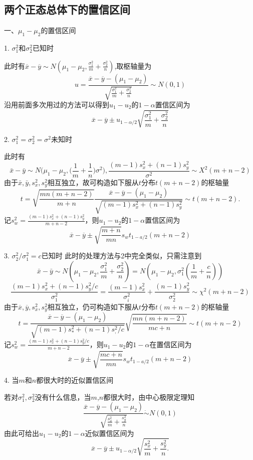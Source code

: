 \subsection{两个正态总体下的置信区间}

一、$\mu_1 -\mu_2$的置信区间

1. $\sigma_1^2$和$\sigma_2^2$已知时

此时有$\overline{x}-\overline{y} \sim N\left(\mu_1-\mu_2,\frac{\sigma_1^2}m+\frac{\sigma_2^2}n\right)$,取枢轴量为
$$
    u=\frac{\overline{x}-\overline{y}-(\mu_{1}-\mu_{2})}{\sqrt{\frac{\sigma_{1}^{2}}{m}+\frac{\sigma_{2}^{2}}n}}\sim N(0,1)
$$
沿用前面多次用过的方法可以得到$u_1 - u_2$的$1-\alpha$置信区间为
$$
    \overline{x}-\overline{y}\pm u_{1-\alpha/2}\sqrt{\frac{\sigma_{1}^{2}}{m}+\frac{\sigma_{2}^{2}}{n}}
$$

2. $\sigma_{1}^{2}=\sigma_{2}^{2}=\sigma^{2}$未知时

此时有
$$
    \bar{x}-\bar{y}\sim N\Big(\mu_1-\mu_2,\Big(\frac1m+\frac1n\Big)\sigma^2\Big), \frac{(m-1)s_x^2+\left(n-1\right)s_y^2}{\sigma^2}\sim X^2(m+n-2)
$$
由于${\bar{x}},{\bar{y}},s_{x}^{2},s_{y}^{2}$相互独立，故可构造如下服从$t$分布$t(m+n-2)$的枢轴量
$$
    t=\sqrt{\frac{mn(m+n-2)}{m+n}}\frac{\overline{x}-\overline{y}-(\mu_{1}-\mu_{2})}{\sqrt{(m-1)s_{x}^{2}+(n-1)s_{y}^{2}}}\sim t(m+n-2).
$$
记$s_w^2=\frac{\left(m-1\right)s_x^2+\left(n-1\right)s_y^2}{m+n-2}$，则$u_1-u_2$的$1-\alpha$置信区间为
$$
    \overline{x}-\overline{y}\pm\sqrt{\frac{m+n}{mn}}s_{w}t_{1-a/2}(m+n-2)
$$

3. $\sigma_{2}^{2}/\sigma_{1}^{2}=c$已知时
此时的处理方法与2中完全类似，只需注意到
$$
    \bar{x}-\bar{y}\sim N\left(\mu_{1}-\mu_{2},\frac{\sigma_{1}^{2}}{m}+\frac{\sigma_{2}^{2}}{n}\right)=N\left(\mu_{1}-\mu_{2},\sigma_{1}^{2}\left(\frac{1}{m}+\frac{c}{n}\right)\right)
$$
$$
    \frac{\left(m-1\right)s_{x}^{2}+\left(n-1\right)s_{y}^{2}/c}{\sigma_{1}^{2}}=\frac{\left(m-1\right)s_{x}^{2}}{\sigma_{i}^{2}}+\frac{\left(n-1\right)s_{y}^{2}}{\sigma_{2}^{2}}\sim\chi^{2}(m+n-2)
$$
由于$\overline{x},\overline{y},s_{x}^{2},s_{y}^{2}$相互独立，仍可构造如下服从$t$分布$t(m+n-2)$的枢轴量
$$
    t=\frac{\overline{x}-\overline{y}-(\mu_{1}-\mu_{2})}{\sqrt{(m-1)s_{*}^{2}+(n-1)s_{,}^{2}/c}}\sqrt{\frac{mn(m+n-2)}{mc+n}}\sim t(m+n-2)
$$
记$s_w^2=\frac{(m-1)s_x^2+(n-1)s_y^2/c}{m+n-2}$，则$u_1-u_2$的$1-\alpha$在置信区间为
$$
    \overline{x}-\overline{y}\pm\sqrt{\frac{mc+n}{mn}}s_{w}t_{1-a/2}(m+n-2)
$$

4. 当$m$和$n$都很大时的近似置信区间

若对$\sigma_1^2 ,\sigma_2^2$没有什么信息，当$m$,$n$都很大时，由中心极限定理知
$$
    \frac{\overline{x}-\overline{y}-(\mu_{1}-\mu_{2})}{\sqrt{\frac{s_{x}^{2}}{m}+\frac{s_{y}^{2}}{n}}}\dot\sim N(0,1)
$$
由此可给出$u_1-u_2$的$1-\alpha$近似置信区间为
$$
    \overline{x}-\overline{y}\pm u_{1-\alpha/2}\sqrt{\frac{s_{x}^{2}}{m}+\frac{s_{y}^{2}}{n}.}
$$


